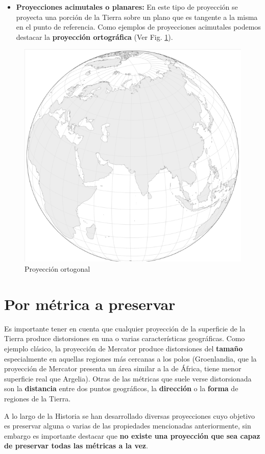 \documentclass[
]{book}
\providecommand{\tightlist}{%
  \setlength{\itemsep}{0pt}\setlength{\parskip}{0pt}}
\theoremstyle{definition}
\theoremstyle{definition}
\theoremstyle{definition}
\theoremstyle{definition}
\theoremstyle{remark}
\begin{document}
\begin{itemize}
\tightlist
\item
  \textbf{Proyecciones acimutales o planares:} En este tipo de proyección se
  proyecta una porción de la Tierra sobre un plano que es tangente a la misma
  en el punto de referencia. Como ejemplos de proyecciones acimutales podemos
  destacar la \textbf{proyección ortográfica} (Ver Fig. \ref{fig:orto}).
\end{itemize}

\begin{figure}

{\centering \includegraphics[width=0.4\linewidth]{img/orto} 

}

\caption{Proyección ortogonal}\label{fig:orto}
\end{figure}

\hypertarget{por-muxe9trica-a-preservar}{%
\section{Por métrica a preservar}\label{por-muxe9trica-a-preservar}}

Es importante tener en cuenta que cualquier proyección de la superficie de la
Tierra produce distorsiones en una o varias características geográficas. Como
ejemplo clásico, la proyección de Mercator produce distorsiones del \textbf{tamaño}
especialmente en aquellas regiones más cercanas a los polos (Groenlandia, que la
proyección de Mercator presenta un área similar a la de África, tiene menor
superficie real que Argelia). Otras de las métricas que suele verse
distorsionada son la \textbf{distancia} entre dos puntos geográficos, la
\textbf{dirección} o la \textbf{forma} de regiones de la Tierra.

A lo largo de la Historia se han desarrollado diversas proyecciones cuyo
objetivo es preservar alguna o varias de las propiedades mencionadas
anteriormente, sin embargo es importante destacar que \textbf{no existe una proyección
que sea capaz de preservar todas las métricas a la vez}.
\end{document}
